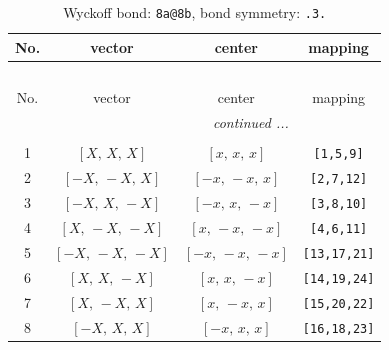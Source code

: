 \documentclass[fleqn,8pt]{jsarticle}
\begin{document}
\begin{longtable}{cccc}
\caption{Wyckoff bond: {\tt 8a@8b}, bond symmetry: {\tt .3.}}
 \\
 \hline \hline
No. & vector & center & mapping \\ \hline \endfirsthead

\multicolumn{3}{l}{\tablename\ \thetable{}} \\
 \hline \hline
No. & vector & center & mapping \\ \hline \endhead

 \hline \hline
\multicolumn{3}{r}{\footnotesize\it continued ...} \\ \endfoot

 \hline \hline
\multicolumn{3}{r}{} \\ \endlastfoot

1 & $\left[ X,\, X,\, X \right]$ & $\left[ x,\, x,\, x \right]$ & {\tt [1,5,9]} \\ \hline
2 & $\left[ - X,\, - X,\, X \right]$ & $\left[ - x,\, - x,\, x \right]$ & {\tt [2,7,12]} \\ \hline
3 & $\left[ - X,\, X,\, - X \right]$ & $\left[ - x,\, x,\, - x \right]$ & {\tt [3,8,10]} \\ \hline
4 & $\left[ X,\, - X,\, - X \right]$ & $\left[ x,\, - x,\, - x \right]$ & {\tt [4,6,11]} \\ \hline
5 & $\left[ - X,\, - X,\, - X \right]$ & $\left[ - x,\, - x,\, - x \right]$ & {\tt [13,17,21]} \\ \hline
6 & $\left[ X,\, X,\, - X \right]$ & $\left[ x,\, x,\, - x \right]$ & {\tt [14,19,24]} \\ \hline
7 & $\left[ X,\, - X,\, X \right]$ & $\left[ x,\, - x,\, x \right]$ & {\tt [15,20,22]} \\ \hline
8 & $\left[ - X,\, X,\, X \right]$ & $\left[ - x,\, x,\, x \right]$ & {\tt [16,18,23]} \\
\end{longtable}
\renewcommand{\arraystretch}{1.2}
\end{document}
